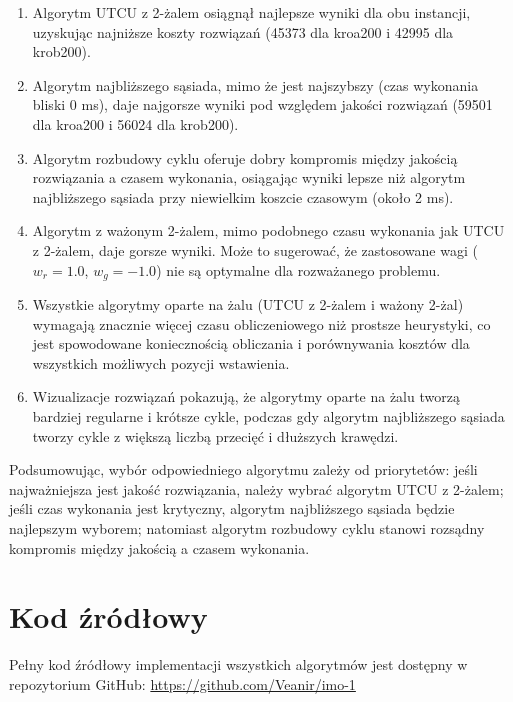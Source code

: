 \documentclass[12pt,a4paper]{article}
\begin{document}
\begin{enumerate}
    \item Algorytm UTCU z 2-żalem osiągnął najlepsze wyniki dla obu instancji, uzyskując najniższe koszty rozwiązań (45373 dla kroa200 i 42995 dla krob200).
    
    \item Algorytm najbliższego sąsiada, mimo że jest najszybszy (czas wykonania bliski 0 ms), daje najgorsze wyniki pod względem jakości rozwiązań (59501 dla kroa200 i 56024 dla krob200).
    
    \item Algorytm rozbudowy cyklu oferuje dobry kompromis między jakością rozwiązania a czasem wykonania, osiągając wyniki lepsze niż algorytm najbliższego sąsiada przy niewielkim koszcie czasowym (około 2 ms).
    
    \item Algorytm z ważonym 2-żalem, mimo podobnego czasu wykonania jak UTCU z 2-żalem, daje gorsze wyniki. Może to sugerować, że zastosowane wagi ($w_r = 1.0$, $w_g = -1.0$) nie są optymalne dla rozważanego problemu.
    
    \item Wszystkie algorytmy oparte na żalu (UTCU z 2-żalem i ważony 2-żal) wymagają znacznie więcej czasu obliczeniowego niż prostsze heurystyki, co jest spowodowane koniecznością obliczania i porównywania kosztów dla wszystkich możliwych pozycji wstawienia.
    
    \item Wizualizacje rozwiązań pokazują, że algorytmy oparte na żalu tworzą bardziej regularne i krótsze cykle, podczas gdy algorytm najbliższego sąsiada tworzy cykle z większą liczbą przecięć i dłuższych krawędzi.
\end{enumerate}

Podsumowując, wybór odpowiedniego algorytmu zależy od priorytetów: jeśli najważniejsza jest jakość rozwiązania, należy wybrać algorytm UTCU z 2-żalem; jeśli czas wykonania jest krytyczny, algorytm najbliższego sąsiada będzie najlepszym wyborem; natomiast algorytm rozbudowy cyklu stanowi rozsądny kompromis między jakością a czasem wykonania.

\section{Kod źródłowy}
Pełny kod źródłowy implementacji wszystkich algorytmów jest dostępny w repozytorium GitHub:
\url{https://github.com/Veanir/imo-1}
\end{document}

